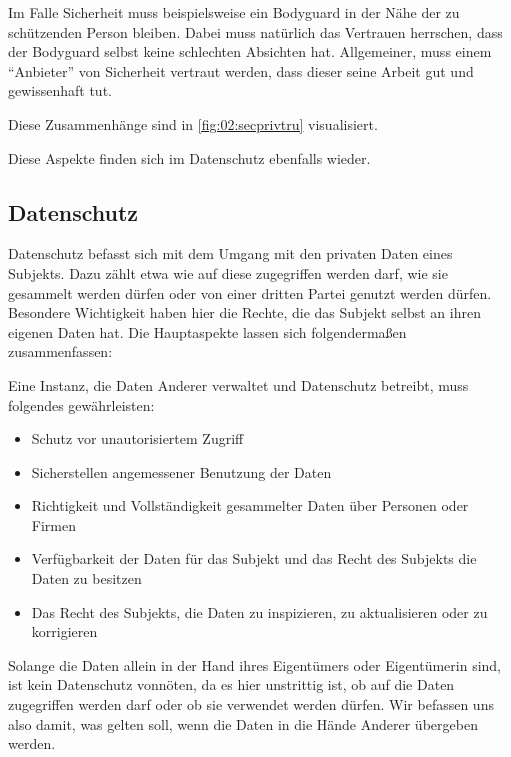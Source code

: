 Im Falle Sicherheit muss beispielsweise ein Bodyguard in der Nähe der zu schützenden Person bleiben.
Dabei muss natürlich das Vertrauen herrschen, dass der Bodyguard selbst keine schlechten Absichten hat.
Allgemeiner, muss einem \enquote{Anbieter} von Sicherheit vertraut werden, dass dieser seine Arbeit gut und gewissenhaft tut.

Diese Zusammenhänge sind in \cref{fig:02:secprivtru} visualisiert.

Diese Aspekte finden sich im Datenschutz ebenfalls wieder.

\subsection{Datenschutz}

Datenschutz befasst sich mit dem Umgang mit den privaten Daten eines Subjekts.
Dazu zählt etwa wie auf diese zugegriffen werden darf, wie sie gesammelt werden dürfen oder von einer dritten Partei genutzt werden dürfen.
Besondere Wichtigkeit haben hier die Rechte, die das Subjekt selbst an ihren eigenen Daten hat.
Die Hauptaspekte lassen sich folgendermaßen zusammenfassen: \cite{lee_ethical_2016}  

\begin{center}
\parbox{0.9\textwidth}{
    Eine Instanz, die Daten Anderer verwaltet und Datenschutz betreibt, muss folgendes gewährleisten: 
    \begin{itemize}
        \item Schutz vor unautorisiertem Zugriff
        \item Sicherstellen angemessener Benutzung der Daten
        \item Richtigkeit und Vollständigkeit gesammelter Daten über Personen oder Firmen
        \item Verfügbarkeit der Daten für das Subjekt und das Recht des Subjekts die Daten zu besitzen
        \item Das Recht des Subjekts, die Daten zu inspizieren, zu aktualisieren oder zu korrigieren
    \end{itemize}
}
\end{center}

Solange die Daten allein in der Hand ihres Eigentümers oder Eigentümerin sind, ist kein Datenschutz vonnöten,
da es hier unstrittig ist, ob auf die Daten zugegriffen werden darf oder ob sie verwendet werden dürfen.
Wir befassen uns also damit, was gelten soll, wenn die Daten in die Hände Anderer übergeben werden.

